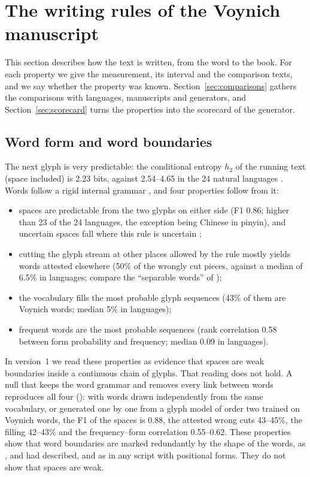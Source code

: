 \section{The writing rules of the Voynich manuscript}
\label{sec:rules}

This section describes how the text is written, from the word to the book. For each property we give the measurement,
its interval and the comparison texts, and we say whether the property was known. Section~\ref{sec:comparisons} gathers
the comparisons with languages, manuscripts and generators, and Section~\ref{sec:scorecard} turns the properties into
the scorecard of the generator.

\subsection{Word form and word boundaries}
\label{sec:boundaries}

The next glyph is very predictable: the conditional entropy $h_2$ of the running text (space included) is 2.23 bits,
against 2.54--4.65 in the 24 natural languages \citep[as found by][]{bennett1976,lindemannbowern2020}. Words follow a
rigid internal grammar \citep{stolfi2000,zattera2022}, and four properties follow from it:
\begin{itemize}
\item spaces are predictable from the two glyphs on either side (F1 0.86; higher than 23 of the 24 languages, the
  exception being Chinese in pinyin), and uncertain spaces fall where this rule is uncertain
  \citep[as observed by][]{feaster2020,rozanova2026};
\item cutting the glyph stream at other places allowed by the rule mostly yields words attested elsewhere (50\% of the
  wrongly cut pieces, against a median of 6.5\% in languages; compare the ``separable words'' of \citealt{zattera2022});
\item the vocabulary fills the most probable glyph sequences (43\% of them are Voynich words; median 5\% in languages);
\item frequent words are the most probable sequences (rank correlation 0.58 between form probability and frequency;
  median 0.09 in languages).
\end{itemize}
In version~1 we read these properties as evidence that spaces are weak boundaries inside a continuous chain of glyphs.
That reading does not hold. A null that keeps the word grammar and removes every link between words reproduces all four
(): with words drawn independently from the same vocabulary, or generated one by one from a glyph model
of order two trained on Voynich words, the F1 of the spaces is 0.88, the attested wrong cuts 43--45\%, the filling 42--43\%
and the frequency--form correlation 0.55--0.62. These properties show that word boundaries are marked redundantly by
the shape of the words, as \citet{stolfi2000}, \citet{feaster2020} and \citet{rozanova2026} had described, and as in
any script with positional forms. They do not show that spaces are weak.

